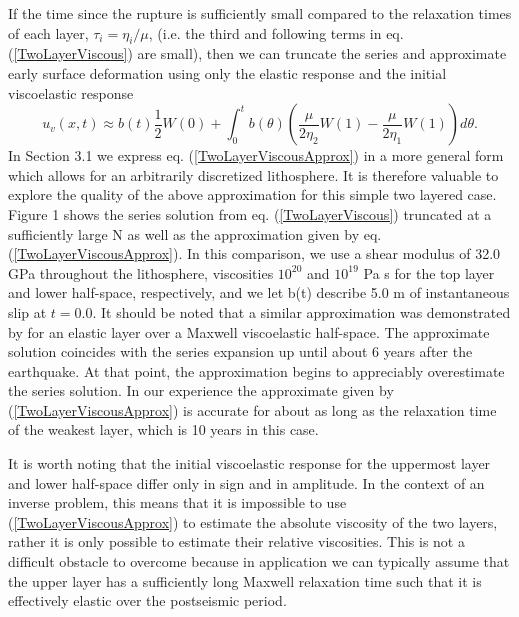 \documentclass[extra]{gji}
\begin{document}
If the time since the rupture is sufficiently small compared to the
relaxation times of each layer, $\tau_i=\eta_i/\mu$, (i.e. the third
and following terms in eq. (\ref{TwoLayerViscous}) are small), then we
can truncate the series and approximate early surface deformation
using only the elastic response and the initial viscoelastic response
\begin{equation}\label{TwoLayerViscousApprox}
 u_v(x,t) \approx b(t)\frac{1}{2}W(0) + 
          \int_0^t b(\theta)\left(\frac{\mu}{2\eta_2}W(1) - 
                  \frac{\mu}{2\eta_1}W(1)\right)d\theta.
\end{equation} 
In Section 3.1 we express eq. (\ref{TwoLayerViscousApprox}) in a more
general form which allows for an arbitrarily discretized lithosphere.
It is therefore valuable to explore the quality of the above
approximation for this simple two layered case. Figure 1 shows the
series solution from eq. (\ref{TwoLayerViscous}) truncated at a
sufficiently large N as well as the approximation given by
eq. (\ref{TwoLayerViscousApprox}). In this comparison, we use a shear
modulus of 32.0 GPa throughout the lithosphere, viscosities $10^{20}$
and $10^{19}$ Pa s for the top layer and lower half-space,
respectively, and we let b(t) describe 5.0 m of instantaneous slip
at $t=0.0$.  It should be noted that a similar approximation was
demonstrated by \citet{S2010} for an elastic layer over a Maxwell
viscoelastic half-space.  The approximate solution coincides with the
series expansion up until about 6 years after the earthquake.  At that
point, the approximation begins to appreciably overestimate the series
solution.  In our experience the approximate given by
(\ref{TwoLayerViscousApprox}) is accurate for about as long as the
relaxation time of the weakest layer, which is 10 years in this case.

It is worth noting that the initial viscoelastic response for the
uppermost layer and lower half-space differ only in sign and in
amplitude.  In the context of an inverse problem, this means that it
is impossible to use (\ref{TwoLayerViscousApprox}) to estimate the
absolute viscosity of the two layers, rather it is only possible to
estimate their relative viscosities.  This is not a difficult obstacle
to overcome because in application we can typically assume that the
upper layer has a sufficiently long Maxwell relaxation time such that
it is effectively elastic over the postseismic period.
\end{document}

